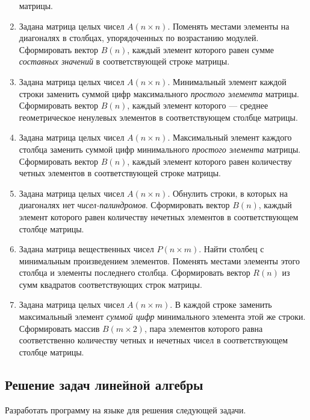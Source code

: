 \begin{enumerate}
матрицы.
\item Задана матрица целых чисел $A(n\times n)$. Поменять местами элементы на диагоналях в столбцах,
упорядоченных по возрастанию модулей. Сформировать вектор $B(n)$, каждый элемент которого
равен сумме \emph{составных значений} в соответствующей строке матрицы.
\item Задана матрица целых чисел $A(n\times n)$. Минимальный элемент каждой строки заменить суммой
цифр максимального \emph{простого элемента} матрицы. Сформировать вектор $B(n)$,
каждый элемент которого --- среднее геометрическое ненулевых элементов в соответствующем столбце матрицы.
\item Задана матрица целых чисел $A(n\times n)$. Максимальный элемент каждого столбца заменить суммой
цифр минимального \emph{простого элемента} матрицы. Сформировать вектор $B(n)$,
каждый элемент которого равен количеству четных элементов в соответствующей строке матрицы.
\item Задана матрица целых чисел $A(n\times n)$. Обнулить строки, в которых на диагоналях нет
\emph{чисел-палиндромов}. Сформировать вектор $B(n)$, каждый
элемент которого равен количеству нечетных элементов в соответствующем столбце матрицы.
\item Задана матрица вещественных чисел $P(n\times m)$. Найти столбец с минимальным
произведением элементов. Поменять местами элементы этого столбца и элементы последнего столбца. Сформировать вектор
$R(n)$ из сумм квадратов соответствующих строк матрицы.
\item Задана матрица целых чисел $A(n\times m)$. В каждой строке заменить максимальный
элемент \emph{суммой цифр} минимального элемента этой же строки. Сформировать массив
$B(m\times 2)$, пара элементов которого равна соответственно количеству четных и
нечетных чисел в соответствующем столбце матрицы.
\end{enumerate}

\subsection[Решение задач линейной алгебры]{Решение задач линейной алгебры}
Разработать программу на языке  для решения следующей задачи.

